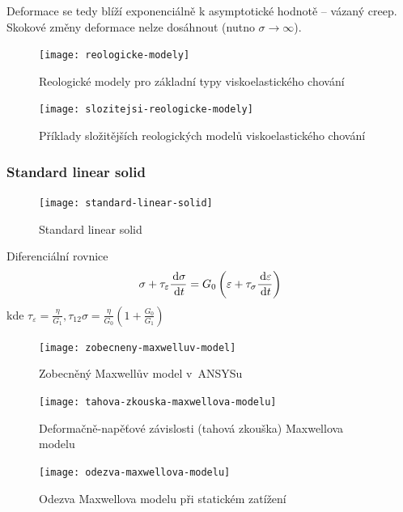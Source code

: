 Deformace se tedy blíží exponenciálně k asymptotické hodnotě -- vázaný creep.
Skokové změny deformace nelze dosáhnout (nutno $\sigma \rightarrow \infty$).

\begin{figure}[H]
	\centering
	\texttt{[image: reologicke-modely]}
	\caption{Reologické modely pro základní typy viskoelastického chování}
	\label{fig:reologicke-modely}
\end{figure}

\begin{figure}[H]
	\centering
	\texttt{[image: slozitejsi-reologicke-modely]}
	\caption{Příklady složitějších reologických modelů viskoelastického chování}
	\label{fig:slozitejsi-reologicke-modely}
\end{figure}

\subsubsection{Standard linear solid}
\begin{figure}[H]
	\centering
	\texttt{[image: standard-linear-solid]}
	\caption{Standard linear solid}
	\label{fig:standard-linear-solid}
\end{figure}

Diferenciální rovnice
\begin{equation}
	\sigma + \tau_\varepsilon \frac{\,\mathrm{d} \sigma}{\,\mathrm{d} t} = G_0 \left(\varepsilon + \tau_\sigma \frac{\,\mathrm{d} \varepsilon}{\,\mathrm{d} t}\right)
\end{equation}
kde $\tau_\varepsilon = \frac{\eta}{G_1}, \tau_{12}\sigma = \frac{\eta}{G_0} \left(1 + \frac{G_0}{G_1}\right)$

\begin{figure}[H]
	\centering
	\texttt{[image: zobecneny-maxwelluv-model]}
	\caption{Zobecněný Maxwellův model v~ANSYSu}
	\label{fig:zobecneny-maxwelluv-model}
\end{figure}

\begin{figure}[H]
	\centering
	\texttt{[image: tahova-zkouska-maxwellova-modelu]}
	\caption{Deformačně-napěťové závislosti (tahová zkouška) Maxwellova modelu}
	\label{fig:tahova-zkouska-maxwellova-modelu}
\end{figure}

\begin{figure}[H]
	\centering
	\texttt{[image: odezva-maxwellova-modelu]}
	\caption{Odezva Maxwellova modelu při statickém zatížení}
	\label{fig:odezva-maxwellova-modelu}
\end{figure}

